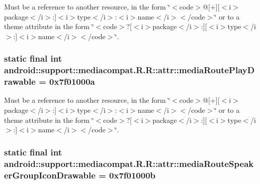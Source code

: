 Must be a reference to another resource, in the form \char`\"{}$<$code$>$@\mbox{[}+\mbox{]}\mbox{[}$<$i$>$package$<$/i$>$:\mbox{]}$<$i$>$type$<$/i$>$:$<$i$>$name$<$/i$>$$<$/code$>$\char`\"{} or to a theme attribute in the form \char`\"{}$<$code$>$?\mbox{[}$<$i$>$package$<$/i$>$:\mbox{]}\mbox{[}$<$i$>$type$<$/i$>$:\mbox{]}$<$i$>$name$<$/i$>$$<$/code$>$\char`\"{}. \hypertarget{classandroid_1_1support_1_1mediacompat_1_1_r_1_1attr_c816ac5237fab43452bb4c5e009f9f26}{
\subsubsection[{mediaRoutePlayDrawable}]{\setlength{\rightskip}{0pt plus 5cm}static final int android::support::mediacompat.R.R::attr::mediaRoutePlayDrawable = 0x7f01000a}}
\label{classandroid_1_1support_1_1mediacompat_1_1_r_1_1attr_c816ac5237fab43452bb4c5e009f9f26}


Must be a reference to another resource, in the form \char`\"{}$<$code$>$@\mbox{[}+\mbox{]}\mbox{[}$<$i$>$package$<$/i$>$:\mbox{]}$<$i$>$type$<$/i$>$:$<$i$>$name$<$/i$>$$<$/code$>$\char`\"{} or to a theme attribute in the form \char`\"{}$<$code$>$?\mbox{[}$<$i$>$package$<$/i$>$:\mbox{]}\mbox{[}$<$i$>$type$<$/i$>$:\mbox{]}$<$i$>$name$<$/i$>$$<$/code$>$\char`\"{}. \hypertarget{classandroid_1_1support_1_1mediacompat_1_1_r_1_1attr_e2019cd778ce65a2ef29a052a86e40f1}{
\subsubsection[{mediaRouteSpeakerGroupIconDrawable}]{\setlength{\rightskip}{0pt plus 5cm}static final int android::support::mediacompat.R.R::attr::mediaRouteSpeakerGroupIconDrawable = 0x7f01000b}}
\label{classandroid_1_1support_1_1mediacompat_1_1_r_1_1attr_e2019cd778ce65a2ef29a052a86e40f1}


